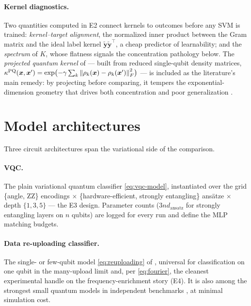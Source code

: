 \paragraph{Kernel diagnostics.} Two quantities computed in E2 connect kernels
to outcomes before any SVM is trained: \emph{kernel--target alignment}, the
normalized inner product between the Gram matrix and the ideal label kernel
$\bm{\tilde{y}} \bm{\tilde{y}}^{\top}$, a cheap predictor of learnability; and
the \emph{spectrum} of $K$, whose flatness signals the concentration pathology
below. The \emph{projected quantum kernel} of \citet{huang2021power} ---
built from reduced single-qubit density matrices,
$\kappa^{\mathrm{PQ}}(\bm{x}, \bm{x}') = \exp\bigl( -\gamma \sum_k
\left\lVert\rho_k(\bm{x}) - \rho_k(\bm{x}')\right\rVert_F^2 \bigr)$ --- is included as the
literature's main remedy: by projecting before comparing, it tempers the
exponential-dimension geometry that drives both concentration and poor
generalization \citep{kubler2021inductive}.

\section{Model architectures}
\label{sec:qml-architectures}

Three circuit architectures span the variational side of the comparison.

\paragraph{VQC.} The plain variational quantum classifier
\eqref{eq:vqc-model}, instantiated over the grid \{angle, ZZ\} encodings
$\times$ \{hardware-efficient, strongly entangling\} ansätze $\times$ depth
$\{1, 3, 5\}$ --- the E3 design. Parameter counts ($3nd_{\mathrm{ansatz}}$ for
strongly entangling layers on $n$ qubits) are logged for every run and define
the MLP matching budgets.

\paragraph{Data re-uploading classifier.} The single- or few-qubit model
\eqref{eq:reuploading} of \citet{perezsalinas2020reuploading}, universal for
classification on one qubit in the many-upload limit and, per
\eqref{eq:fourier}, the cleanest experimental handle on the
frequency-enrichment story (E4). It is also among the strongest small quantum
models in independent benchmarks \citep{bowles2024better}, at minimal
simulation cost.

